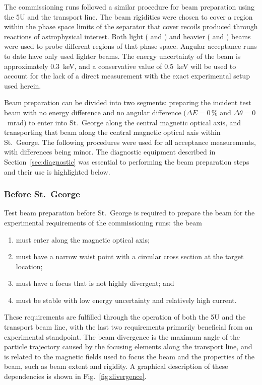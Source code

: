 The commissioning runs followed a similar procedure for beam preparation
using the 5U and the transport line. The beam rigidities were chosen to
cover a region within the phase space limits of the separator that cover
recoils produced through reactions of astrophysical interest. Both light
( and ) and heavier ( and )
beams were used to probe different regions of that phase space. Angular
acceptance runs to date have only used lighter beams. The energy
uncertainty of the beam is approximately 0.3~keV, and a conservative
value of 0.5~keV will be used to account for the lack of a direct
measurement with the exact experimental setup used herein.

Beam preparation can be divided into two segments: preparing the
incident test beam with no energy difference and no angular difference
($\Delta E = 0$\,\% and $\Delta\theta = 0$~mrad) to enter into St.\
George along the central magnetic optical axis, and transporting that
beam along the central magnetic optical axis within St.\ George. The
following procedures were used for all acceptance measurements, with
differences being minor. The diagnostic equipment described in
Section~\ref{sec:diagnostic} was essential to performing the beam
preparation steps and their use is highlighted below.

\subsubsection{Before St.\ George}

Test beam preparation before St.\ George is required to prepare the beam
for the experimental requirements of the commissioning runs: the beam
\begin{enumerate}[leftmargin=2\parindent]
    \item must enter along the magnetic optical axis;
    \item must have a narrow waist point with a circular cross section
        at the target location;
    \item must have a focus that is not highly divergent; and
    \item must be stable with low energy uncertainty and relatively high
        current.
\end{enumerate}
These requirements are fulfilled through the operation of both the 5U
and the transport beam line, with the last two requirements primarily
beneficial from an experimental standpoint. The beam divergence is the
maximum angle of the particle trajectory caused by the focusing elements
along the transport line, and is related to the magnetic fields used to
focus the beam and the properties of the beam, such as beam extent and
rigidity. A graphical description of these dependencies is shown in
Fig.~\ref{fig:divergence}.

